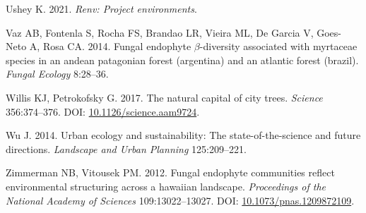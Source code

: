 \documentclass[fleqn,10pt,lineno]{wlpeerj} %
\newlength{\cslhangindent}
\newenvironment{CSLReferences}[2] %
 {%
  \setlength{\parindent}{0pt}
  \ifodd #1 \everypar{\setlength{\hangindent}{\cslhangindent}}\ignorespaces\fi
  \ifnum #2 > 0
  \setlength{\parskip}{#2\baselineskip}
  \fi
 }%
 {}
\begin{document}
\begin{CSLReferences}{1}{0}
\leavevmode{}%
Ushey K. 2021. \emph{Renv: Project environments}.

\leavevmode{}%
Vaz AB, Fontenla S, Rocha FS, Brandao LR, Vieira ML, De Garcia V, Goes-Neto A, Rosa CA. 2014. Fungal endophyte \(\beta\)-diversity associated with myrtaceae species in an andean patagonian forest (argentina) and an atlantic forest (brazil). \emph{Fungal Ecology} 8:28--36.

\leavevmode{}%
Willis KJ, Petrokofsky G. 2017. The natural capital of city trees. \emph{Science} 356:374--376. DOI: \href{https://doi.org/10.1126/science.aam9724}{10.1126/science.aam9724}.

\leavevmode{}%
Wu J. 2014. Urban ecology and sustainability: The state-of-the-science and future directions. \emph{Landscape and Urban Planning} 125:209--221.

\leavevmode{}%
Zimmerman NB, Vitousek PM. 2012. Fungal endophyte communities reflect environmental structuring across a hawaiian landscape. \emph{Proceedings of the National Academy of Sciences} 109:13022--13027. DOI: \href{https://doi.org/10.1073/pnas.1209872109}{10.1073/pnas.1209872109}.

\end{CSLReferences}
\end{document}
